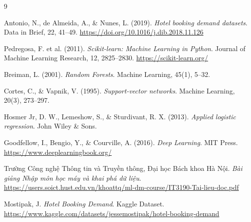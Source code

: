 \documentclass[12pt, a4paper]{article}
\begin{document}
\newpage
\begin{thebibliography}{9}

Antonio, N., de Almeida, A., \& Nunes, L. (2019).
\textit{Hotel booking demand datasets}.
Data in Brief, 22, 41--49.
\url{https://doi.org/10.1016/j.dib.2018.11.126}

Pedregosa, F. et al. (2011).
\textit{Scikit-learn: Machine Learning in Python}.
Journal of Machine Learning Research, 12, 2825--2830.
\url{https://scikit-learn.org/}

Breiman, L. (2001).
\textit{Random Forests}.
Machine Learning, 45(1), 5--32.

Cortes, C., \& Vapnik, V. (1995).
\textit{Support-vector networks}.
Machine Learning, 20(3), 273--297.

Hosmer Jr, D. W., Lemeshow, S., \& Sturdivant, R. X. (2013).
\textit{Applied logistic regression}.
John Wiley \& Sons.

Goodfellow, I., Bengio, Y., \& Courville, A. (2016).
\textit{Deep Learning}.
MIT Press.
\url{https://www.deeplearningbook.org/}

Trường Công nghệ Thông tin và Truyền thông, Đại học Bách khoa Hà Nội.
\textit{Bài giảng Nhập môn học máy và khai phá dữ liệu}.
\url{https://users.soict.hust.edu.vn/khoattq/ml-dm-course/IT3190-Tai-lieu-doc.pdf}

Mostipak, J.
\textit{Hotel Booking Demand}. Kaggle Dataset.
\url{https://www.kaggle.com/datasets/jessemostipak/hotel-booking-demand}

\end{thebibliography}
\end{document}
